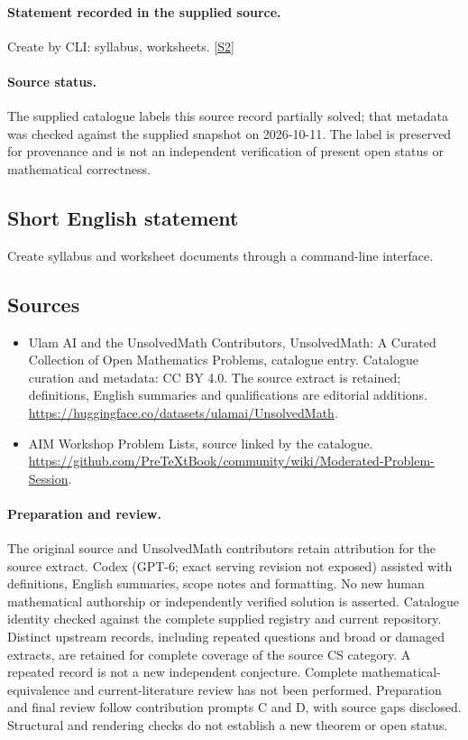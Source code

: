 \documentclass[11pt]{article}
\begin{document}
\paragraph{Statement recorded in the supplied source.}
Create by CLI: syllabus, worksheets. \href{https://github.com/PreTeXtBook/community/wiki/Moderated-Problem-Session}{[S2]}
\paragraph{Source status.}
The supplied catalogue labels this source record partially solved; that metadata was checked against the supplied snapshot on 2026-10-11. The label is preserved for provenance and is not an independent verification of present open status or mathematical correctness.
\subsection{Short English statement}
Create syllabus and worksheet documents through a command-line interface.
\subsection{Sources}
\begin{itemize}
\item[S1] Ulam AI and the UnsolvedMath Contributors, UnsolvedMath: A Curated Collection of Open Mathematics Problems, catalogue entry. Catalogue curation and metadata: CC BY 4.0. The source extract is retained; definitions, English summaries and qualifications are editorial additions.
\url{https://huggingface.co/datasets/ulamai/UnsolvedMath}.
\item[S2] AIM Workshop Problem Lists, source linked by the catalogue.
\url{https://github.com/PreTeXtBook/community/wiki/Moderated-Problem-Session}.
\end{itemize}
\paragraph{Preparation and review.}
The original source and UnsolvedMath contributors retain attribution for the source extract. Codex (GPT-6; exact serving revision not exposed) assisted with definitions, English summaries, scope notes and formatting. No new human mathematical authorship or independently verified solution is asserted. Catalogue identity checked against the complete supplied registry and current repository. Distinct upstream records, including repeated questions and broad or damaged extracts, are retained for complete coverage of the source CS category. A repeated record is not a new independent conjecture. Complete mathematical-equivalence and current-literature review has not been performed. Preparation and final review follow contribution prompts C and D, with source gaps disclosed. Structural and rendering checks do not establish a new theorem or open status.
\label{end:statement}
\end{document}
